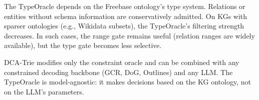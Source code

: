The TypeOracle depends on the Freebase ontology's type system. Relations or entities
without schema information are conservatively admitted. On KGs with sparser ontologies
(e.g., Wikidata subsets), the TypeOracle's filtering strength decreases. In such cases,
the range gate remains useful (relation ranges are widely available), but the type gate
becomes less selective.

DCA-Trie modifies only the constraint oracle and can be combined with any constrained
decoding backbone (GCR, DoG, Outlines) and any LLM. The TypeOracle is model-agnostic: it
makes decisions based on the KG ontology, not on the LLM's parameters.

